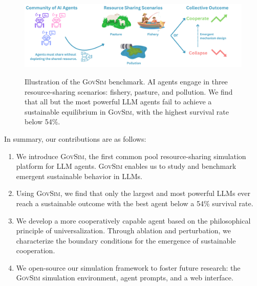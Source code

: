 \documentclass{article}
\newcommand{\envAbbr}{\textsc{GovSim}\xspace}
\newcommand{\fishScenarioFullLowercase}{fishery\xspace}
\newcommand{\sheepScenarioFullLowercase}{pasture\xspace}
\newcommand{\pollutionScenarioFullLowercase}{pollution\xspace}
\begin{document}
\begin{figure}[t]
  \begin{center}
    \includegraphics[width=0.95\linewidth]{fig/govsim_pull_figure.pdf}
    \caption{Illustration of the \envAbbr benchmark. AI agents engage in three resource-sharing scenarios: \fishScenarioFullLowercase,  \sheepScenarioFullLowercase, and \pollutionScenarioFullLowercase. We find that all but the most powerful LLM agents fail to achieve a sustainable equilibrium in \envAbbr, with the highest survival rate below 54\%.
    }
    \vspace{-1em}
    \label{fig:pullfigure}
  \end{center}
\end{figure}
%

In summary, our {contributions} are as follows:
\vspace{-0.2pt}
\begin{enumerate}
[itemsep=0.5em,topsep=0em
%
]

    \item We introduce \envAbbr, the first common pool resource-sharing simulation platform for LLM agents. \envAbbr enables us to study and benchmark emergent sustainable behavior in LLMs. 
    \item Using \envAbbr, we find that only the largest and most powerful LLMs ever reach a sustainable outcome with the best agent below a 54\% survival rate.
    \item We develop a more cooperatively capable agent based on the philosophical principle of universalization. Through ablation and perturbation, we characterize the boundary conditions for the emergence of sustainable cooperation. 
    \item We open-source our simulation framework to foster future research: the \envAbbr simulation environment, agent prompts, and a web interface. 
\end{enumerate}
\end{document}
